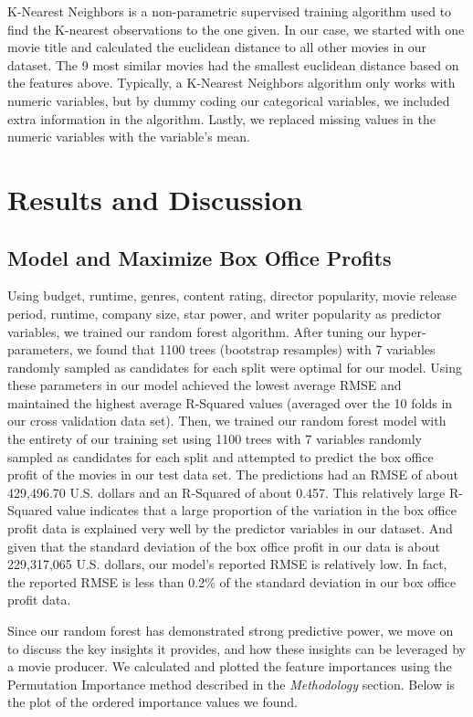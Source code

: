 \documentclass[10pt]{article}
\begin{document}
K-Nearest Neighbors is a non-parametric supervised training algorithm used to find the K-nearest observations to the one given. In our case, we started with one movie title and calculated the euclidean distance to all other movies in our dataset. The 9 most similar movies had the smallest euclidean distance based on the features above. Typically, a K-Nearest Neighbors algorithm only works with numeric variables, but by dummy coding our categorical variables, we included extra information in the algorithm. Lastly, we replaced missing values in the numeric variables with the variable’s mean.

\section{Results and Discussion}
\subsection{Model and Maximize Box Office Profits}

Using budget, runtime, genres, content rating, director popularity, movie release period, runtime, company size, star power, and writer popularity as predictor variables, we trained our random forest algorithm. After tuning our hyper-parameters, we found that 1100 trees (bootstrap resamples) with 7 variables randomly sampled as candidates for each split were optimal for our model. Using these parameters in our model achieved the lowest average RMSE and maintained the highest average R-Squared values (averaged over the 10 folds in our cross validation data set). Then, we trained our random forest model with the entirety of our training set using 1100 trees with 7 variables randomly sampled as candidates for each split and attempted to predict the box office profit of the movies in our test data set. The predictions had an RMSE of about 429,496.70 U.S. dollars and an R-Squared of about 0.457. This relatively large R-Squared value indicates that a large proportion of the variation in the box office profit data is explained very well by the predictor variables in our dataset. And given that the standard deviation of the box office profit in our data is about 229,317,065 U.S. dollars, our model’s reported RMSE is relatively low. In fact, the reported RMSE is less than 0.2\% of the standard deviation in our box office profit data.

Since our random forest has demonstrated strong predictive power, we move on to discuss the key insights it provides, and how these insights can be leveraged by a movie producer. We calculated and plotted the feature importances using the Permutation Importance method described in the \textit{Methodology} section. Below is the plot of the ordered importance values we found.
\end{document}
